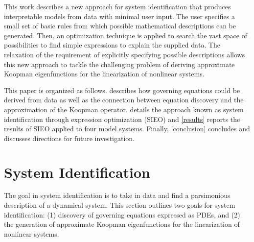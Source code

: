 \documentclass{article}
\begin{document}
This work describes a new approach for system identification that produces interpretable models from data with minimal user input. The user specifies a small set of basic rules from which possible mathematical descriptions can be generated. Then, an optimization technique is applied to search the vast space of possibilities to find simple expressions to explain the supplied data. The relaxation of the requirement of explicitly specifying possible descriptions allows this new approach to tackle the challenging problem of deriving approximate Koopman eigenfunctions for the linearization of nonlinear systems.

This paper is organized as follows.  describes how governing equations could be derived from data as well as the connection between equation discovery and the approximation of the Koopman operator.  details the approach known as system identification through expression optimization (SIEO) and \cref{results} reports the results of SIEO applied to four model systems. Finally, \cref{conclusion} concludes and discusses directions for future investigation. 



\section{System Identification}
\label{systemidentification}

The goal in system identification is to take in data and find a parsimonious description of a dynamical system. This section outlines two goals for system identification: (1) discovery of governing equations expressed as PDEs, and (2) the generation of approximate Koopman eigenfunctions for the linearization of nonlinear systems.
\end{document}

